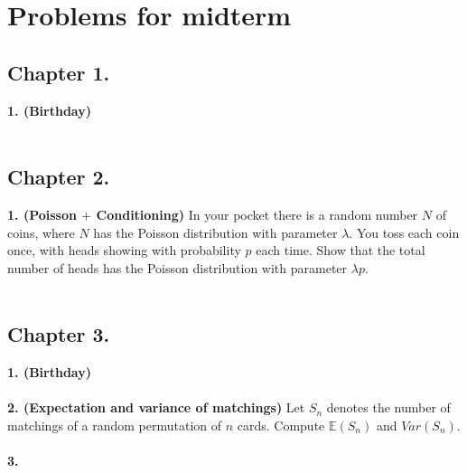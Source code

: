 \documentclass[12pt]{article}
\begin{document}
\section*{Problems for midterm}
\subsection*{Chapter 1.}
\textbf{1. (Birthday)}
\\ \\
\subsection*{Chapter 2.}
\textbf{1. (Poisson $+$ Conditioning)} In your pocket there is a random number $N$ of coins, where $N$ has the Poisson distribution with parameter $\lambda$. You toss each coin once, with heads showing with probability $p$ each time. Show that the total number of heads has the Poisson distribution with parameter $\lambda p$. \\ \\
\subsection*{Chapter 3.}
\textbf{1. (Birthday)}
\\ \\
\textbf{2. (Expectation and variance of matchings)} Let $S_n$ denotes the number of matchings of a random permutation of $n$ cards. Compute $\mathbb{E}(S_n)$ and $Var(S_n)$.
\\ \\
\textbf{3.}



\newpage
\end{document}
